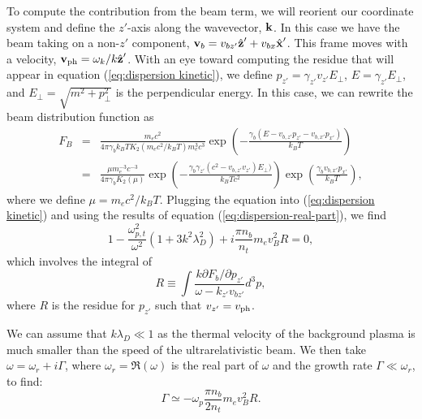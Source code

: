 \documentclass[usenatbib,iop,apj,numberedappendix]{aeb_emulateapj_2015}
\newcommand\bmath[1] {\mbox{\boldmath$\rm #1$}}
\def\gz{\gamma_{z'}}
\def\vz{v_{z'}}
\newcommand{\vel}{\ensuremath{\bmath{v}}}
\newcommand{\kvec}{\ensuremath{\bmath{k}}}
\newcommand{\xphat}{\ensuremath{\hat{\bmath{x}}'}}
\newcommand{\zphat}{\ensuremath{\hat{\bmath{z}}'}}
\newcommand{\betabeamz}{\ensuremath{\beta_{\rm b,z}}}
\newcommand{\betabeamx}{\ensuremath{\beta_{\rm b,x}}}
\newcommand{\gammabeam}{\ensuremath{\gamma_{\rm b}}}
\begin{document}
\begin{appendix}
To compute the contribution from the beam term, we will reorient our coordinate system and define the $z'$-axis along the wavevector, $\kvec$.  In this case we have the beam taking on a non-$z'$ component,  $\vel_b = v_{bz'}\zphat+v_{bx}\xphat$.   
This frame moves with a velocity, $\vel_{\rm ph} = \omega_k/k \zphat$.  With an eye toward computing the residue that will appear in equation (\ref{eq:dispersion kinetic}), we define $p_{z'}=\gz\vz E_\perp$, $E=\gz E_\perp$, and
$E_\perp=\sqrt{m^2+p_\perp^2}$ is the perpendicular energy.  In this case, we can rewrite the beam distribution function as
\begin{eqnarray}
F_B &=& \frac{m_e c^2}{4\pi\gamma_b k_B T K_2(m_ec^2/k_B T )m_e^3c^3} \exp\left(-\frac {\gamma_b(E - v_{b,z'} p_{z'} - v_{b,x'} p_{x'})} {k_B T}\right)\\
&=& \frac{\mu m_e^{-3}c^{-3}}{4\pi\gamma_b K_2(\mu)}  \exp\left(-\frac {\gamma_b\gz(c^2 - v_{b,z'}v_{z'})E_\perp)} {k_BT c^2}\right)\exp\left(\frac{\gamma_bv_{b,x'} p_{x'}}{k_BT}\right),\label{eq:dist2}
\end{eqnarray}
where we define $\mu = m_ec^2/k_BT$.
Plugging the equation into (\ref{eq:dispersion kinetic}) and using the results of equation (\ref{eq:dispersion-real-part}), we find 
\begin{equation}
 1 - \frac{\omega_{p,t}^2}{\omega^2}\left(1 + 3 {k^2\lambda_D^2}\right) + i\frac{\pi n_b}{n_t}   m_e v_B^2 R = 0, 
\end{equation}
which involves the integral of 
\begin{equation}
R\equiv \int \frac{k\partial F_b/\partial p_{z'}}{\omega - k_{z'}v_{bz'}}d^3p,
\end{equation}
where $R$ is the residue for $p_{z'}$ such that $v_{z'} = v_{\rm ph}$.  

We can assume that $k\lambda_D \ll 1$ as the thermal velocity of the background plasma is much smaller than the speed of the ultrarelativistic beam.  We then take $\omega = \omega_r + i\Gamma$, where $\omega_r = \Re(\omega)$ is the real part of $\omega$ and the growth rate $\Gamma \ll \omega_r$, to find:
\begin{equation}
\Gamma \simeq -\omega_p\frac{\pi n_b}{2 n_t}   m_e v_B^2 R.
\end{equation}


\end{appendix}
\end{document}
